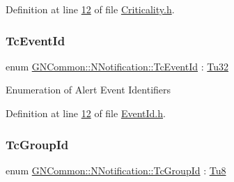 Definition at line \mbox{\hyperlink{_criticality_8h_source_l00012}{12}} of file \mbox{\hyperlink{_criticality_8h_source}{Criticality.\+h}}.

\mbox{\label{namespace_g_n_common_1_1_n_notification_a8d5ce0e5fbb0a6cdcd96e4b037656761}} 
\subsubsection{\texorpdfstring{Tc\+Event\+Id}{TcEventId}}
{\footnotesize\ttfamily enum \mbox{\hyperlink{namespace_g_n_common_1_1_n_notification_a8d5ce0e5fbb0a6cdcd96e4b037656761}{G\+N\+Common\+::\+N\+Notification\+::\+Tc\+Event\+Id}} \+: \mbox{\hyperlink{namespace_g_n_common_a941b527ef318f318aed7903dc832b7e4}{Tu32}}\hspace{0.3cm}{\ttfamily [strong]}}

Enumeration of Alert Event Identifiers 

Definition at line \mbox{\hyperlink{_event_id_8h_source_l00012}{12}} of file \mbox{\hyperlink{_event_id_8h_source}{Event\+Id.\+h}}.

\mbox{\label{namespace_g_n_common_1_1_n_notification_af29017ad6ed59156beabc385a91db18e}} 
\subsubsection{\texorpdfstring{Tc\+Group\+Id}{TcGroupId}}
{\footnotesize\ttfamily enum \mbox{\hyperlink{namespace_g_n_common_1_1_n_notification_af29017ad6ed59156beabc385a91db18e}{G\+N\+Common\+::\+N\+Notification\+::\+Tc\+Group\+Id}} \+: \mbox{\hyperlink{namespace_g_n_common_a7939e251ddbf5d3a31832dcfdc8bde39}{Tu8}}\hspace{0.3cm}{\ttfamily [strong]}}

